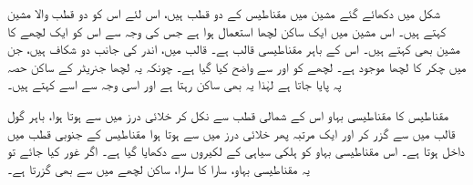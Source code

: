 شکل  میں دکھائے گئے مشین میں مقناطیس کے دو قطب ہیں، اس لئے اس کو دو قطب والا مشین کہتے ہیں۔ اس مشین میں ایک ساکن لچھا استعمال ہوا ہے جس کی وجہ سے اس کو ایک لچھے کا مشین بھی کہتے ہیں۔ اس کے باہر مقناطیسی قالب ہے۔ قالب میں، اندر کی جانب دو  شکاف ہیں، جن میں   چکر کا لچھا موجود ہے۔ لچھے کو  اور  سے واضح کیا گیا ہے۔ چونکہ یہ لچھا جنریٹر کے ساکن حصہ پہ پایا جاتا ہے لہٰذا  یہ بھی ساکن رہتا ہے اور اسی وجہ سے اسے   کہتے ہیں۔

 مقناطیس کا مقناطیسی بہاو اس کے شمالی قطب   سے نکل کر خلائی درز میں سے ہوتا ہوا، باہر گول قالب میں سے گزر کر اور ایک مرتبہ پھر  خلائی درز میں سے ہوتا ہوا مقناطیس کے جنوبی قطب    میں داخل ہوتا ہے۔ اس مقناطیسی بہاو کو  ہلکی سیاہی کے لکیروں سے دکھایا گیا ہے۔  اگر غور کیا جائے تو یہ  مقناطیسی بہاو، سارا کا سارا، ساکن لچھے میں سے بھی گزرتا ہے۔

